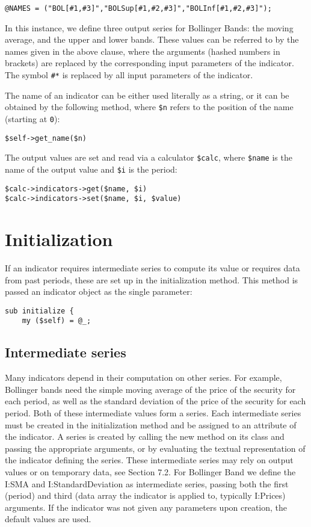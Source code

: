 \documentclass[11pt,twoside]{article}
\begin{document}
\begin{lstlisting}[name=example]
@NAMES = ("BOL[#1,#3]","BOLSup[#1,#2,#3]","BOLInf[#1,#2,#3]");
\end{lstlisting}
In this instance, we define three output series for Bollinger Bands: the
moving average, and the upper and lower bands. These values can be
referred to by the names given in the above clause, where the arguments
(hashed numbers in brackets) are replaced by the corresponding input
parameters of the indicator. The symbol \lstinline!#*! is
replaced by all input parameters of the indicator.

The name of an indicator can be either used literally as a string, or it
can be obtained by the following method, where \lstinline!$n!
refers to the position of the name (starting at
\lstinline!0!):
\begin{lstlisting}[numbers=none]
$self->get_name($n)
\end{lstlisting}

The output values are set and read via a calculator
\lstinline!$calc!, where \lstinline!$name! is the
name of the output value and \lstinline!$i! is the period:
\begin{lstlisting}[numbers=none]
$calc->indicators->get($name, $i)
$calc->indicators->set($name, $i, $value)
\end{lstlisting}


\section{Initialization}
If an indicator requires intermediate series to compute its value or
requires data from past periods, these are set up in the initialization
method. This method is passed an indicator object as the single
parameter:

\begin{lstlisting}[name=example]
sub initialize {
    my ($self) = @_;
\end{lstlisting}

\subsection[Intermediate series]{Intermediate series}
Many indicators depend in their computation on other series. For
example, Bollinger bands need the simple moving average of the price of
the security for each period, as well as the standard deviation of the
price of the security for each period. Both of these intermediate
values form a series. Each intermediate series must be created in the
initialization method and be assigned to an attribute of the indicator.
A series is created by calling the new method on its class and passing
the appropriate arguments, or by evaluating the textual representation
of the indicator defining the series. These intermediate series may
rely on output values or on temporary data, see Section 7.2. For
Bollinger Band we define the I:SMA and I:StandardDeviation as
intermediate series, passing both the first (period) and third (data
array the indicator is applied to, typically I:Prices) arguments. If
the indicator was not given any parameters upon creation, the default
values are used.
\end{document}
